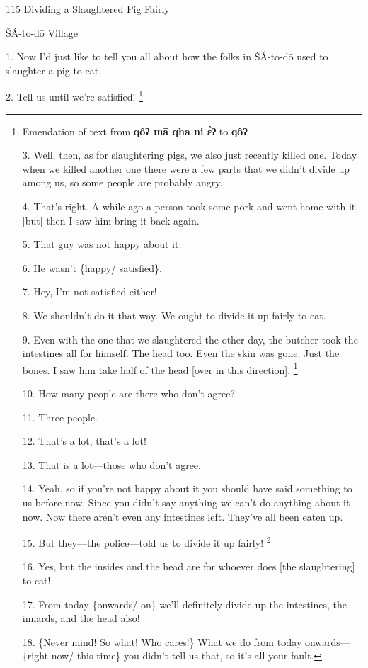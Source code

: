 
115 Dividing a Slaughtered Pig Fairly

ŠÁ-to-dō Village

1. Now I'd just like to tell you all about how the folks in ŠÁ-to-dō used to
slaughter a pig to eat.

2. Tell us until we're satisfied! \footnote{Emendation of text from \textbf{qôʔ mā qha ni ɛ̀ʔ} to \textbf{qôʔ}

3. Well, then, as for slaughtering pigs, we also just recently killed one. Today
when we killed another one there were a few parts that we didn't divide up among
us, so some people are probably angry.

4. That's right. A while ago a person took some pork and went home with it, [but]
then I saw him bring it back again.

5. That guy was not happy about it.

6. He wasn't \{happy/ satisfied\}.

7. Hey, I'm not satisfied either!

8. We shouldn't do it that way. We ought to divide it up fairly to eat.

9. Even with the one that we slaughtered the other day, the butcher took the intestines
all for himself. The head too. Even the skin was gone. Just the bones. I saw him
take half of the head [over in this direction]. \footnote{This parenthesized phrase is a wordy attempt to translate the verb-particle}

10. How many people are there who don't agree?

11. Three people.

12. That's a lot, that's a lot!

13. That is a lot---those who don't agree.

14. Yeah, so if you're not happy about it you should have said something to us
before now. Since you didn't say anything we can't do anything about it now. Now
there aren't even any intestines left. They've all been eaten up.

15. But they---the police---told us to divide it up fairly! \footnote{The pig in question was supposedly donated to the village by a local squad}

16. Yes, but the insides and the head are for whoever does [the slaughtering] to
eat!

17. From today \{onwards/ on\} we'll definitely divide up the intestines, the innards,
and the head also!

18. \{Never mind! So what! Who cares!\} What we do from today onwards---\{right
now/ this time\} you didn't tell us that, so it's all your fault.

}

